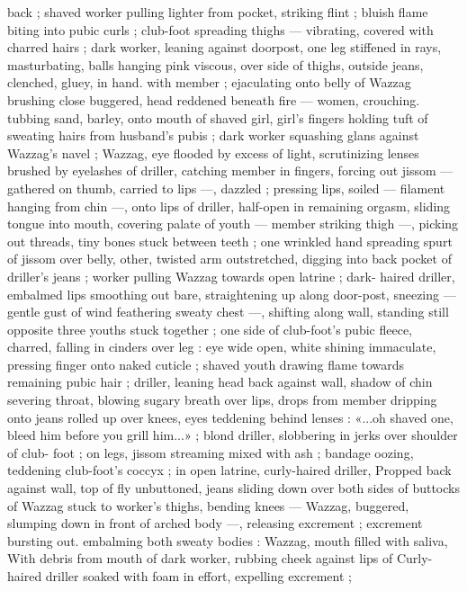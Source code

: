 back ; shaved worker pulling lighter from pocket, striking flint ; bluish
flame biting into pubic curls ; club-foot spreading thighs ---
vibrating, covered with charred hairs ; dark worker, leaning against
doorpost, one leg stiffened in rays, masturbating, balls hanging pink
viscous, over side of thighs, outside jeans, clenched, gluey, in hand.
with member ; ejaculating onto belly of Wazzag brushing close
buggered, head reddened beneath fire --- women, crouching.
tubbing sand, barley, onto mouth of shaved girl, girl's fingers
holding tuft of sweating hairs from husband's pubis ; dark worker
squashing glans against Wazzag's navel ; Wazzag, eye flooded by
excess of light, scrutinizing lenses brushed by eyelashes of driller,
catching member in fingers, forcing out jissom --- gathered on
thumb, carried to lips ---, dazzled ; pressing lips, soiled --- filament
hanging from chin ---, onto lips of driller, half-open in remaining
orgasm, sliding tongue into mouth, covering palate of youth ---
member striking thigh ---, picking out threads, tiny bones stuck
between teeth ; one wrinkled hand spreading spurt of jissom over
belly, other, twisted arm outstretched, digging into back pocket of
driller's jeans ; worker pulling Wazzag towards open latrine ; dark-
haired driller, embalmed lips smoothing out bare, straightening up
along door-post, sneezing --- gentle gust of wind feathering sweaty
chest ---, shifting along wall, standing still opposite three youths
stuck together ; one side of club-foot's pubic fleece, charred, falling
in cinders over leg : eye wide open, white shining immaculate,
pressing finger onto naked cuticle ; shaved youth drawing flame
towards remaining pubic hair ; driller, leaning head back against wall,
shadow of chin severing throat, blowing sugary breath over lips,
drops from member dripping onto jeans rolled up over knees, eyes
teddening behind lenses : «...oh shaved one, bleed him before you
grill him...» ; blond driller, slobbering in jerks over shoulder of club-
foot ; on legs, jissom streaming mixed with ash ; bandage oozing,
teddening club-foot's coccyx ; in open latrine, curly-haired driller,
Propped back against wall, top of fly unbuttoned, jeans sliding down
over both sides of buttocks of Wazzag stuck to worker's thighs,
bending knees --- Wazzag, buggered, slumping down in front of
arched body ---, releasing excrement ; excrement bursting out.
embalming both sweaty bodies : Wazzag, mouth filled with saliva,
With debris from mouth of dark worker, rubbing cheek against lips of
Curly-haired driller soaked with foam in effort, expelling excrement ;
